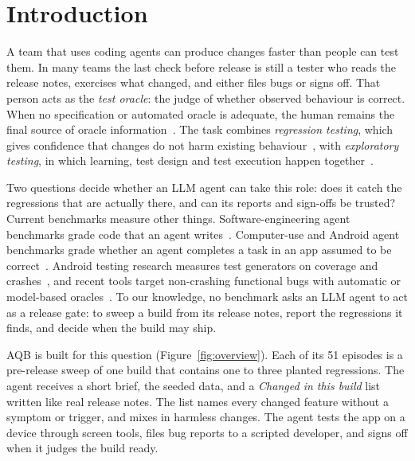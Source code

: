 \documentclass[sigconf]{acmart}
\newcommand{\aqb}{AQB\xspace}
\begin{document}

\maketitle
\pagestyle{plain}

\section{Introduction}

A team that uses coding agents can produce changes faster than people can test them. In many teams
the last check before release is still a tester who reads the release notes, exercises what changed,
and either files bugs or signs off. That person acts as the \emph{test oracle}: the judge of whether
observed behaviour is correct. When no specification or automated oracle is adequate, the human
remains the final source of oracle information~\cite{barr2015oracle}. The task combines
\emph{regression testing}, which gives confidence that changes do not harm existing
behaviour~\cite{yoo2012regression}, with \emph{exploratory testing}, in which learning, test design
and test execution happen together~\cite{itkonen2005exploratory}.

Two questions decide whether an LLM agent can take this role: does it catch the regressions that are
actually there, and can its reports and sign-offs be trusted? Current benchmarks measure other
things. Software-engineering agent benchmarks grade code that an agent
writes~\cite{jimenez2024swebench,merrill2026terminalbench}. Computer-use and Android agent benchmarks
grade whether an agent completes a task in an app assumed to be
correct~\cite{rawles2025androidworld,xu2025androidlab,xie2024osworld}. Android testing research
measures test generators on coverage and crashes~\cite{li2017droidbot,mao2016sapienz,su2017stoat,su2021themis},
and recent tools target non-crashing functional bugs with automatic or model-based
oracles~\cite{su2021genie,wang2022deepstate,liu2025visiondroid,liu2025guipilot}. To our knowledge,
no benchmark asks an LLM agent to act as a release gate: to sweep a build from its release notes,
report the regressions it finds, and decide when the build may ship.

\aqb is built for this question (Figure~\ref{fig:overview}). Each of its 51 episodes is a pre-release
sweep of one build that contains one to three planted regressions. The agent receives a short brief,
the seeded data, and a \emph{Changed in this build} list written like real release notes. The list
names every changed feature without a symptom or trigger, and mixes in harmless changes. The agent
tests the app on a device through screen tools, files bug reports to a scripted developer, and signs
off when it judges the build ready.
\end{document}
